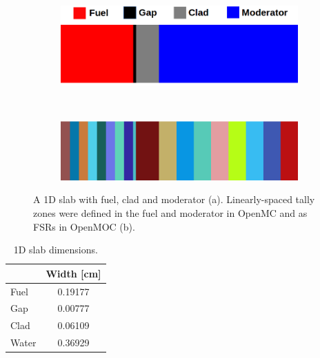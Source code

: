 \begin{figure}[h!]
\begin{subfigure}{\textwidth}
  \centering
  \includegraphics[width=0.7\linewidth]{figures/biases/slab/slab-simple-labels}
  \caption{}
\end{subfigure} \\
\begin{subfigure}{\textwidth}
  \centering
  \includegraphics[width=0.7\linewidth]{figures/biases/slab/slab-8x}
  \caption{}
\end{subfigure}
\caption[1D slab materials and geometry]{A 1D slab with fuel, clad and moderator (a). Linearly-spaced tally zones were defined in the fuel and moderator in OpenMC and as \ac{FSR}s in OpenMOC (b).}
\label{fig:chap4-slab}
\end{figure}

\begin{table}[h!]
  \centering
  \caption[1D slab dimensions]{1D slab dimensions.}
  \small
  \label{table:chap4-slab-widths} 
  \vspace{6pt}
  \begin{tabular}{b c}
  \toprule
  \rowcolor{lightgray}
  \multicolumn{1}{c}{\bf Material} &
  \multicolumn{1}{c}{\bf Width [cm]} \\
  \midrule
  Fuel &  0.19177 \\
  Gap &   0.00777 \\
  Clad &  0.06109 \\
  Water & 0.36929 \\
  \bottomrule
\end{tabular}
\end{table}

